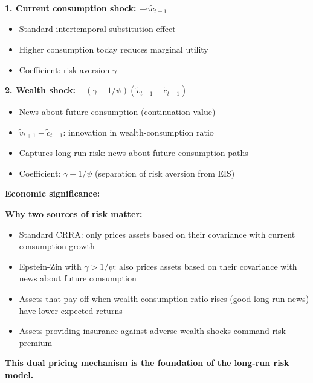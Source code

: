\documentclass{beamer}
\begin{document}
\begin{frame}[allowframebreaks]
    \textbf{1. Current consumption shock: $-\gamma \tilde{c}_{t+1}$}
    \begin{itemize}
        \item Standard intertemporal substitution effect
        \item Higher consumption today reduces marginal utility
        \item Coefficient: risk aversion $\gamma$
    \end{itemize}
    
    \textbf{2. Wealth shock: $-(\gamma - 1/\psi)(\tilde{v}_{t+1} - \tilde{c}_{t+1})$}
    \begin{itemize}
        \item News about future consumption (continuation value)
        \item $\tilde{v}_{t+1} - \tilde{c}_{t+1}$: innovation in wealth-consumption ratio
        \item Captures long-run risk: news about future consumption paths
        \item Coefficient: $\gamma - 1/\psi$ (separation of risk aversion from EIS)
    \end{itemize}
    
    \framebreak
    
    \textbf{Economic significance:}
    
    \textbf{Why two sources of risk matter:}
    \begin{itemize}
        \item Standard CRRA: only prices assets based on their covariance with current consumption growth
        
        \item Epstein-Zin with $\gamma > 1/\psi$: also prices assets based on their covariance with news about future consumption
        
        \item Assets that pay off when wealth-consumption ratio rises (good long-run news) have lower expected returns
        
        \item Assets providing insurance against adverse wealth shocks command risk premium
    \end{itemize}
    
    \textbf{This dual pricing mechanism is the foundation of the long-run risk model.}
\end{frame}
\end{document}
